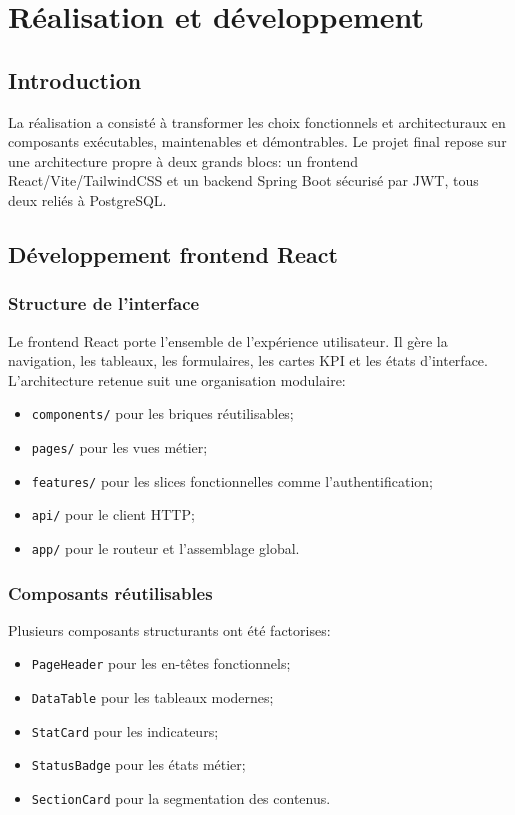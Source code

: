 ﻿\chapter{Réalisation et développement}
\label{chap:implementation}

\section{Introduction}
La réalisation a consisté à transformer les choix fonctionnels et architecturaux en composants exécutables, maintenables et démontrables. Le projet final repose sur une architecture propre à deux grands blocs: un frontend React/Vite/TailwindCSS et un backend Spring Boot sécurisé par JWT, tous deux reliés à PostgreSQL.

\section{Développement frontend React}
\subsection{Structure de l'interface}
Le frontend React porte l'ensemble de l'expérience utilisateur. Il gère la navigation, les tableaux, les formulaires, les cartes KPI et les états d'interface. L'architecture retenue suit une organisation modulaire:
\begin{itemize}
  \item \texttt{components/} pour les briques réutilisables;
  \item \texttt{pages/} pour les vues métier;
  \item \texttt{features/} pour les slices fonctionnelles comme l'authentification;
  \item \texttt{api/} pour le client HTTP;
  \item \texttt{app/} pour le routeur et l'assemblage global.
\end{itemize}

\subsection{Composants réutilisables}
Plusieurs composants structurants ont été factorises:
\begin{itemize}
  \item \texttt{PageHeader} pour les en-têtes fonctionnels;
  \item \texttt{DataTable} pour les tableaux modernes;
  \item \texttt{StatCard} pour les indicateurs;
  \item \texttt{StatusBadge} pour les états métier;
  \item \texttt{SectionCard} pour la segmentation des contenus.
\end{itemize}

